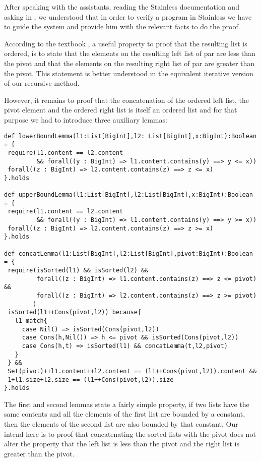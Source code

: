 \documentclass[a4paper,11pt]{article}
\theoremstyle{mytheor}
\begin{document}
After speaking with the assistants, reading the Stainless documentation and asking in \cite{concatenation}, we understood that in order to verify a program in Stainless we have to guide the system and provide him with the relevant facts to do the proof. 

According to the textbook \cite{calculus-of-computation}, a useful property to proof that the resulting list is ordered, is to state that the elements on the resulting left list of par are less than the pivot and that the elements on the resulting right list of par are greater than the pivot. This statement is better understood in the equivalent iterative version of our recursive method.

However, it remains to proof that the concatenation of the ordered left list, the pivot element and the ordered right list is itself an ordered list and for that purpose we had to introduce three auxiliary lemmas: 

\begin{lstlisting}[label={list:first},caption=Auxiliar lemmas in our proof]
def lowerBoundLemma(l1:List[BigInt],l2: List[BigInt],x:BigInt):Boolean = {
 require(l1.content == l2.content 
         && forall((y : BigInt) => l1.content.contains(y) ==> y <= x))
 forall((z : BigInt) => l2.content.contains(z) ==> z <= x) 
}.holds

def upperBoundLemma(l1:List[BigInt],l2:List[BigInt],x:BigInt):Boolean = {
 require(l1.content == l2.content 
         && forall((y : BigInt) => l1.content.contains(y) ==> y >= x))
 forall((z : BigInt) => l2.content.contains(z) ==> z >= x) 
}.holds
  
def concatLemma(l1:List[BigInt],l2:List[BigInt],pivot:BigInt):Boolean = {
 require(isSorted(l1) && isSorted(l2) && 
         forall((z : BigInt) => l1.content.contains(z) ==> z <= pivot) && 
         forall((z : BigInt) => l2.content.contains(z) ==> z >= pivot) 
        )
 isSorted(l1++Cons(pivot,l2)) because{
   l1 match{
     case Nil() => isSorted(Cons(pivot,l2))
     case Cons(h,Nil()) => h <= pivot && isSorted(Cons(pivot,l2))
     case Cons(h,t) => isSorted(l1) && concatLemma(t,l2,pivot)
   }     
 } &&
 Set(pivot)++l1.content++l2.content == (l1++Cons(pivot,l2)).content &&
 1+l1.size+l2.size == (l1++Cons(pivot,l2)).size
}.holds
\end{lstlisting}

The first and second lemmas state a fairly simple property, if two lists have the same contents and all the elements of the first list are bounded by a constant, then the elements of the second list are also bounded by that constant. Our intend here is to proof that concatenating the sorted lists with the pivot  does not alter the property that the left list is less than the pivot and the right list is greater than the pivot. 
\end{document}

